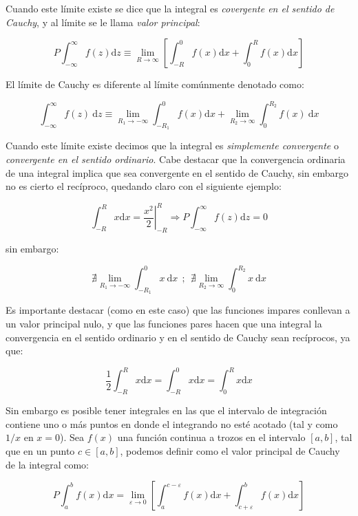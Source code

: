 \documentclass[12pt,a4paper]{book}
\newcommand{\ccorchetes}[1]{\left[ #1  \right]}
\newcommand{\D}{\mathrm{d}}
\begin{document}
Cuando este límite existe se dice que la integral es \textit{covergente en el sentido de Cauchy}, y al límite se le llama \textit{valor principal}:

\begin{equation}
P \int_{-\infty}^{\infty} f(z) \D z \equiv \lim_{R \rightarrow \infty} \ccorchetes{\int_{-R}^0 f(x) \D x + \int_0^R f(x) \D x }
\end{equation}

El límite de Cauchy es diferente al límite comúnmente denotado como: 

\begin{equation}
\int_{-\infty}^{\infty} f(z) \ \D z \equiv  \lim_{R_1 \rightarrow  -\infty} \int_{-R_1}^0 f(x) \D x +  \lim_{R_2 \rightarrow  \infty} \int_0^{R_2} f(x) \ \D x 
\end{equation}

Cuando este límite existe decimos que la integral es \textit{simplemente convergente} o \textit{convergente en el sentido ordinario}. Cabe destacar que la convergencia ordinaria de una integral implica que sea convergente en el sentido de Cauchy, sin embargo no es cierto el recíproco, quedando claro con el siguiente ejemplo:

$$ \int_{-R}^R x \D x = \left. \dfrac{x^2}{2} \right|_{-R}^R \Longrightarrow P \int_{-\infty}^{\infty} f(z) \D z = 0 $$

sin embargo:

$$ \nexists \lim_{R_1 \rightarrow  -\infty} \int_{-R_1}^0 x \ \D x \ \ ; \ \ \nexists  \lim_{R_2 \rightarrow  \infty} \int_0^{R_2} x \ \D x $$ 

Es importante destacar (como en este caso) que las funciones impares conllevan a un valor principal nulo, y que las funciones pares hacen que una integral la convergencia en el sentido ordinario y en el sentido de Cauchy sean recíprocos, ya que:

$$ \dfrac{1}{2}  \int_{-R}^R x \D x  =  \int_{-R}^0 x \D x =  \int_{0}^R x \D x    $$

Sin embargo es posible tener integrales en las que el intervalo de integración contiene uno o más puntos en donde el integrando no esté acotado (tal y como $1/x$ en $x=0$). Sea $f(x)$ una función continua a trozos en el intervalo $[a,b]$, tal que en un punto $c \in [a,b]$, podemos definir como el valor principal de Cauchy de la integral como:

\begin{equation}
P \int_a^b f(x) \D x = \lim_ {\varepsilon \rightarrow 0} \ccorchetes{ \int_a^{c-\varepsilon} f(x) \D x + \int_{c + \varepsilon}^b f(x) \D x}
\end{equation}
\end{document}
